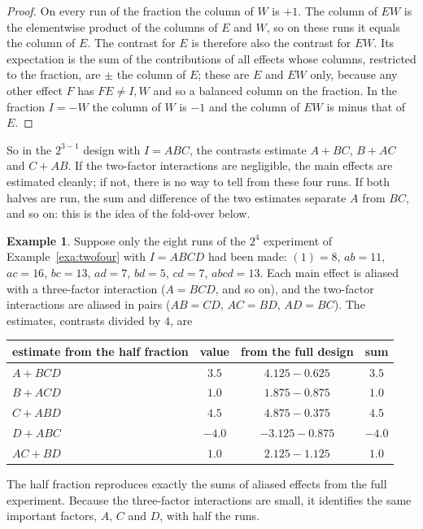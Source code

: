\documentclass[11pt,a4paper]{article}
\numberwithin{equation}{section}
\theoremstyle{definition}
\newtheorem{exa}[thm]{Example}
\begin{document}
\begin{proof}
On every run of the fraction the column of $W$ is $+1$. The column of $EW$ is the elementwise product of the columns of $E$ and $W$, so on these runs it
equals the column of $E$. The contrast for $E$ is therefore also the contrast for $EW$. Its expectation is the sum of the contributions of all effects
whose columns, restricted to the fraction, are $\pm$ the column of $E$; these are $E$ and $EW$ only, because any other effect $F$ has $FE \ne I, W$ and so a
balanced column on the fraction. In the fraction $I = -W$ the column of $W$ is $-1$ and the column of $EW$ is minus that of $E$.
\end{proof}

So in the $2^{3-1}$ design with $I = ABC$, the contrasts estimate $A + BC$, $B + AC$ and $C + AB$. If the two-factor interactions are negligible, the main
effects are estimated cleanly; if not, there is no way to tell from these four runs. If both halves are run, the sum and difference of the two
estimates separate $A$ from $BC$, and so on: this is the idea of the fold-over below.

\begin{exa}\label{exa:half-fraction}
Suppose only the eight runs of the $2^4$ experiment of Example~\ref{exa:twofour} with $I = ABCD$ had been made: $(1) = 8$, $ab = 11$, $ac = 16$, $bc = 13$, $ad = 7$, $bd = 5$,
$cd = 7$, $abcd = 13$. Each main effect is aliased with a three-factor interaction ($A = BCD$, and so on), and the two-factor interactions are aliased in
pairs ($AB = CD$, $AC = BD$, $AD = BC$). The estimates, contrasts divided by $4$, are
\begin{center}
\begin{tabular}{l|c|c|c}
estimate from the half fraction & value & from the full design & sum \\
\hline
$A + BCD$ & $3.5$ & $4.125 - 0.625$ & $3.5$ \\
$B + ACD$ & $1.0$ & $1.875 - 0.875$ & $1.0$ \\
$C + ABD$ & $4.5$ & $4.875 - 0.375$ & $4.5$ \\
$D + ABC$ & $-4.0$ & $-3.125 - 0.875$ & $-4.0$ \\
$AC + BD$ & $1.0$ & $2.125 - 1.125$ & $1.0$
\end{tabular}
\end{center}
The half fraction reproduces exactly the sums of aliased effects from the full experiment. Because the three-factor interactions are small, it
identifies the same important factors, $A$, $C$ and $D$, with half the runs.
\end{exa}
\end{document}
